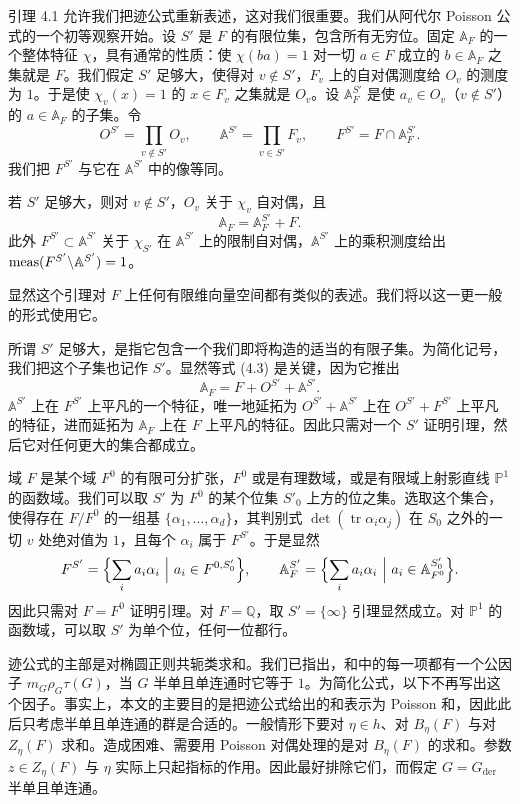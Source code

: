 引理 4.1 允许我们把迹公式重新表述，这对我们很重要。我们从阿代尔 Poisson 公式的一个初等观察开始。设 $S'$ 是 $F$ 的有限位集，包含所有无穷位。固定 $\mathbb A_F$ 的一个整体特征 $\chi$，具有通常的性质：使 $\chi(ba)=1$ 对一切 $a\in F$ 成立的 $b\in\mathbb A_F$ 之集就是 $F$。我们假定 $S'$ 足够大，使得对 $v\notin S'$，$F_v$ 上的自对偶测度给 $O_v$ 的测度为 $1$。于是使 $\chi_v(x)=1$ 的 $x\in F_v$ 之集就是 $O_v$。设 $\mathbb A_F^{S'}$ 是使 $a_v\in O_v$（$v\notin S'$）的 $a\in\mathbb A_F$ 的子集。令
\[
O^{S'}=\prod_{v\notin S'}O_v,\qquad
\mathbb A^{S'}=\prod_{v\in S'}F_v,\qquad
F^{S'}=F\cap\mathbb A_F^{S'}.
\]
我们把 $F^{S'}$ 与它在 $\mathbb A^{S'}$ 中的像等同。

\begin{lemma}
\setcounter{theorem}{1}
若 $S'$ 足够大，则对 $v\notin S'$，$O_v$ 关于 $\chi_v$ 自对偶，且
\begin{equation}\tag{4.3}
\mathbb A_F=\mathbb A_F^{S'}+F.
\end{equation}
此外 $F^{S'}\subset\mathbb A^{S'}$ 关于 $\chi_{S'}$ 在 $\mathbb A^{S'}$ 上的限制自对偶，$\mathbb A^{S'}$ 上的乘积测度给出 $\operatorname{meas}(F^{S'}\backslash\mathbb A^{S'})=1$。
\end{lemma}

显然这个引理对 $F$ 上任何有限维向量空间都有类似的表述。我们将以这一更一般的形式使用它。

所谓 $S'$ 足够大，是指它包含一个我们即将构造的适当的有限子集。为简化记号，我们把这个子集也记作 $S'$。显然等式 (4.3) 是关键，因为它推出
\[
\mathbb A_F=F+O^{S'}+\mathbb A^{S'}.
\]
$\mathbb A^{S'}$ 上在 $F^{S'}$ 上平凡的一个特征，唯一地延拓为 $O^{S'}+\mathbb A^{S'}$ 上在 $O^{S'}+F^{S'}$ 上平凡的特征，进而延拓为 $\mathbb A_F$ 上在 $F$ 上平凡的特征。因此只需对一个 $S'$ 证明引理，然后它对任何更大的集合都成立。

域 $F$ 是某个域 $F^0$ 的有限可分扩张，$F^0$ 或是有理数域，或是有限域上射影直线 $\mathbb P^1$ 的函数域。我们可以取 $S'$ 为 $F^0$ 的某个位集 $S'_0$ 上方的位之集。选取这个集合，使得存在 $F/F^0$ 的一组基 $\{\alpha_1,\dots,\alpha_d\}$，其判别式 $\det(\operatorname{tr}\alpha_i\alpha_j)$ 在 $S_0$ 之外的一切 $v$ 处绝对值为 $1$，且每个 $\alpha_i$ 属于 $F^{S'}$。于是显然
\[
F^{S'}=\Bigl\{\sum_ia_i\alpha_i\ \Big|\ a_i\in F^{0,S'_0}\Bigr\},
\qquad
\mathbb A_F^{S'}=\Bigl\{\sum_ia_i\alpha_i\ \Big|\ a_i\in\mathbb A^{S'_0}_{F^0}\Bigr\}.
\]
因此只需对 $F=F^0$ 证明引理。对 $F=\mathbb Q$，取 $S'=\{\infty\}$ 引理显然成立。对 $\mathbb P^1$ 的函数域，可以取 $S'$ 为单个位，任何一位都行。

迹公式的主部是对椭圆正则共轭类求和。我们已指出，和中的每一项都有一个公因子 $m_G\rho_G\tau(G)$，当 $G$ 半单且单连通时它等于 $1$。为简化公式，以下不再写出这个因子。事实上，本文的主要目的是把迹公式给出的和表示为 Poisson 和，因此此后只考虑半单且单连通的群是合适的。一般情形下要对 $\eta\in h$、对 $B_\eta(F)$ 与对 $Z_\eta(F)$ 求和。造成困难、需要用 Poisson 对偶处理的是对 $B_\eta(F)$ 的求和。参数 $z\in Z_\eta(F)$ 与 $\eta$ 实际上只起指标的作用。因此最好排除它们，而假定 $G=G_{\mathrm{der}}$ 半单且单连通。

